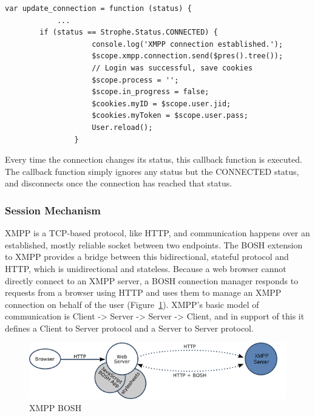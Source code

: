 	\begin{lstlisting}[label=code:connect_callback,caption=Stanzas Format]
		var update_connection = function (status) {
            ...
		if (status == Strophe.Status.CONNECTED) {
                    console.log('XMPP connection established.');
                    $scope.xmpp.connection.send($pres().tree());
                    // Login was successful, save cookies
                    $scope.process = '';
                    $scope.in_progress = false;
                    $cookies.myID = $scope.user.jid;
                    $cookies.myToken = $scope.user.pass;
                    User.reload();
                }
	\end{lstlisting}

Every time the connection changes its status, this callback function is executed. The callback function simply ignores any status but the CONNECTED status, and disconnects once the connection has reached that status.

\subsubsection{Session Mechanism}
XMPP is a TCP-based protocol, like HTTP, and communication happens over an established, mostly reliable socket between two endpoints. The BOSH extension to XMPP provides a bridge between this bidirectional, stateful protocol and HTTP, which is unidirectional and stateless. Because a web browser cannot directly connect to an XMPP server, a BOSH connection manager responds to requests from a browser using HTTP and uses them to manage an XMPP connection on behalf of the user (Figure~\ref{img:xmpp-bosh}).  XMPP's basic model of communication is Client -> Server -> Server -> Client, and in support of this it defines a Client to Server protocol and a Server to Server protocol.
  \begin{figure}[!ht]
  \centering
  \includegraphics[scale=0.6]{images/xmpp-bosh.png}   
  \caption[BOSH]{XMPP BOSH}
  \label{img:xmpp-bosh}                        
  \end{figure} 

